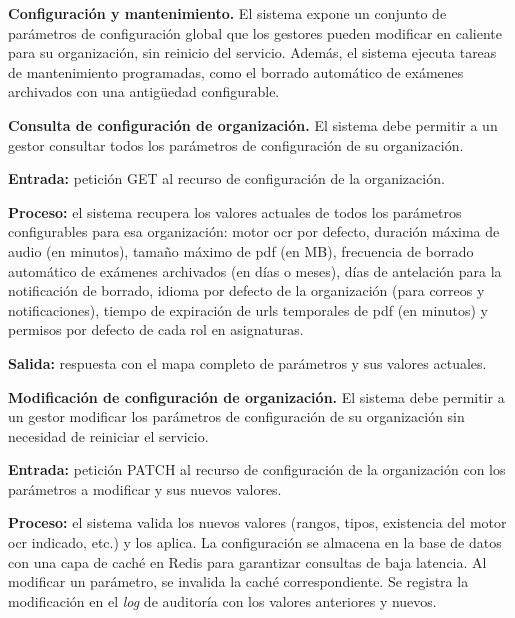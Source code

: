 
\item \textbf{Configuración y mantenimiento.} \label{rf:config}
El sistema expone un conjunto de parámetros de configuración global que los gestores pueden
modificar en caliente para su organización, sin reinicio del servicio. Además, el sistema
ejecuta tareas de mantenimiento programadas, como el borrado automático de exámenes
archivados con una antigüedad configurable.

\begin{functional}

    \item \textbf{Consulta de configuración de organización.}
    \label{rf:config:query}
    El sistema debe permitir a un gestor consultar todos los parámetros de configuración de
    su organización.

    \textbf{Entrada:} petición GET al recurso de configuración de la organización.

    \textbf{Proceso:} el sistema recupera los valores actuales de todos los parámetros
    configurables para esa organización: motor \acs{ocr} por defecto, duración máxima de
    audio (en minutos), tamaño máximo de \acs{pdf} (en MB), frecuencia de borrado
    automático de exámenes archivados (en días o meses), días de antelación para la
    notificación de borrado, idioma por defecto de la organización (para correos y
    notificaciones), tiempo de expiración de \acsp{url} temporales de \acs{pdf} (en
    minutos) y permisos por defecto de cada rol en asignaturas.

    \textbf{Salida:} respuesta con el mapa completo de parámetros y sus valores actuales.

    \item \textbf{Modificación de configuración de organización.}
    \label{rf:config:update}
    El sistema debe permitir a un gestor modificar los parámetros de configuración de su
    organización sin necesidad de reiniciar el servicio.

    \textbf{Entrada:} petición PATCH al recurso de configuración de la organización con los
    parámetros a modificar y sus nuevos valores.

    \textbf{Proceso:} el sistema valida los nuevos valores (rangos, tipos, existencia del
    motor \acs{ocr} indicado, etc.) y los aplica. La configuración se almacena en la base
    de datos con una capa de caché en Redis para garantizar consultas de baja latencia. Al
    modificar un parámetro, se invalida la caché correspondiente. Se registra la
    modificación en el \textit{log} de auditoría con los valores anteriores y nuevos.


\end{functional}
